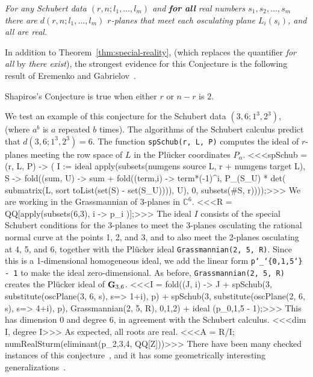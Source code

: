 {\it 
For any Schubert data $(r,n;l_1,\ldots,l_m)$ and {\bf for all} real numbers
$s_1,s_2,\ldots,s_m$ there are $d(r,n;l_1,\ldots,l_m)$
$r$-planes that meet each osculating plane $L_i(s_i)$, and all are real.
}\medskip

In addition to Theorem~\ref{thm:special-reality}, (which replaces the 
quantifier {\it for all}\/ by  {\it there exist}), the strongest evidence for
this Conjecture is the following result of Eremenko and
Gabrielov~\cite{SO:EG00}. 

\begin{theorem}
Shapiros's Conjecture is true when either $r$ or $n-r$ is $2$.
\end{theorem}

We test an example of this conjecture for the Schubert data
$(3,6;1^3,2^3)$, (where $a^b$ is $a$ repeated $b$ times).
The algorithms of the Schubert calculus predict that $d(3,6;1^3,2^3)=6$.
The function {\tt spSchub(r, L, P)} computes the ideal of $r$-planes meeting
the row space of $L$ in the Pl\"ucker coordinates $P_\alpha$.
%
<<<spSchub = (r, L, P) -> (
     I := ideal apply(subsets(numgens source L, 
                      r + numgens target L), S -> 
          fold((sum, U) -> sum +
           fold((term,i) -> term*(-1)^i, P_(S_U) * det(
            submatrix(L, sort toList(set(S) - set(S_U)))), U), 
               0, subsets(#S, r))));>>>
%
We are working in the Grassmannian of 3-planes in 
${\mathbb C}^6$.
%
<<<R = QQ[apply(subsets(6,3), i -> p_i )];>>>
%
The ideal $I$ consists of the
special Schubert conditions for the 3-planes to meet the 3-planes osculating
the rational normal curve at the points 1, 2, and 3, and to also meet the
2-planes osculating at 4, 5, and 6,
together with the Pl\"ucker ideal {\tt Grassmannian(2, 5, R)}.
Since this is a 1-dimensional homogeneous ideal, we add the linear form 
{\tt p{\char`\_}\char`\{0,1,5{\char`\}} - 1} to make the ideal
zero-dimensional.
As before, {\tt Grassmannian(2, 5, R)} creates the Pl\"ucker ideal of 
${\bf G}_{3,6}$.
%
<<<I = fold((J, i) -> J +
      spSchub(3, substitute(oscPlane(3, 6, s), {s=> 1+i}), p) +
      spSchub(3, substitute(oscPlane(2, 6, s), {s=> 4+i}), p), 
      Grassmannian(2, 5, R), {0,1,2}) + 
     ideal (p_{0,1,5} - 1);>>>
%
This has dimension 0 and degree 6, in agreement with the Schubert calculus.
%
<<<dim I, degree I>>>
%
As expected, all roots are real.
%
<<<A = R/I; numRealSturm(eliminant(p_{2,3,4}, QQ[Z]))>>>
%
There have been many checked instances of this
conjecture~\cite{SO:So_shap-www,SO:So00b,SO:Ver00}, and it has some
geometrically interesting generalizations~\cite{SO:So_flags}.

